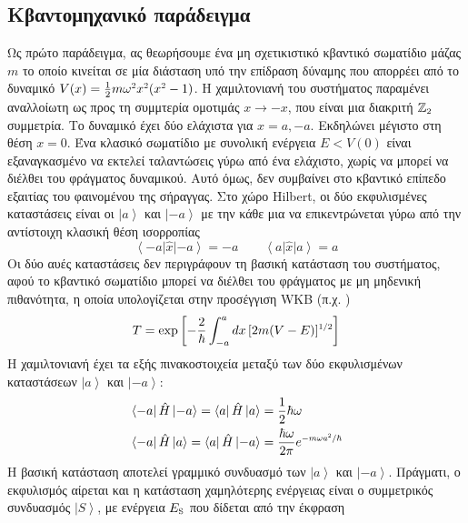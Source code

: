 \subsection{Κβαντομηχανικό παράδειγμα}
Ως πρώτο παράδειγμα, ας θεωρήσουμε ένα μη σχετικιστικό κβαντικό σωματίδιο μάζας $m$ το οποίο κινείται σε μία διάσταση υπό την επίδραση δύναμης που απορρέει από το δυναμικό 
$V(x)= \frac{1}{2}m\omega\superscr{2}x\superscr{2}(x\superscr{2}-1)$. Η χαμιλτονιανή του συστήματος παραμένει αναλλοίωτη ως προς τη συμμτερία ομοτιμάς $x \to -x$, που είναι μια διακριτή $\mathbb{Z}\subscr{2}$ συμμετρία. Το δυναμικό έχει δύο ελάχιστα %
για $x=a,-a$. Εκδηλώνει μέγιστο στη θέση $x=0$. Ένα κλασικό σωματίδιο με συνολική ενέργεια $E<V(0)$ είναι εξαναγκασμένο να εκτελεί ταλαντώσεις γύρω από ένα ελάχιστο, χωρίς να μπορεί να διέλθει του φράγματος δυναμικού. Αυτό όμως, δεν συμβαίνει στο κβαντικό επίπεδο εξαιτίας του φαινομένου της σήραγγας. Στο χώρο Hilbert, οι δύο εκφυλισμένες καταστάσεις είναι οι $\left|a\right>$ και $\left|-a\right>$ με την κάθε μια να επικεντρώνεται γύρω από την αντίστοιχη κλασική θέση ισορροπίας 
\begin{equation}
    \left<-a\right|\hat{x}\left|-a\right>=-a\qquad\left<a\right|\hat{x}\left|a\right>=a
\end{equation}
Οι δύο αυές καταστάσεις δεν περιγράφουν τη βασική κατάσταση του συστήματος, αφού το κβαντικό σωματίδιο μπορεί να διέλθει του φράγματος με μη μηδενική πιθανότητα, η οποία υπολογίζεται στην προσέγγιση WKB (π.χ. \cite{griffiths_qm})
\begin{equation}
    T=\exp\left[ -\frac{2}{\hbar}\int_{-a}^{a}dx\,[2m(V-E)]\superscr{1/2} \right]
\end{equation}
Η χαμιλτονιανή έχει τα εξής πινακοστοιχεία μεταξύ των δύο εκφυλισμένων καταστάσεων $\left|a\right>$ και $\left|-a\right>$: 
\begin{equation}
\begin{split}
    &\left<-a\right|\hat{H}\left|-a\right>=\left<a\right|\hat{H}\left|a\right>=\frac{1}{2}\hbar\omega\\
    &\left<-a\right|\hat{H}\left|a\right>=\left<a\right|\hat{H}\left|-a\right>=\frac{\hbar\omega}{2\pi}e\superscr{-m\omega a\superscr{2}/\hbar}
\end{split}
\end{equation}
Η βασική κατάσταση αποτελεί γραμμικό συνδυασμό των $\left|a\right>$ και $\left|-a\right>$. Πράγματι, ο εκφυλισμός αίρεται και η κατάσταση χαμηλότερης ενέργειας είναι ο συμμετρικός συνδυασμός $\left|S\right>$, με ενέργεια $E\subscr{\text{S}}$ που δίδεται από την έκφραση
